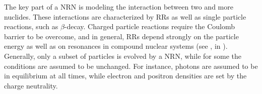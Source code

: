 The key part of a \ac{NRN} is modeling the interaction between two 
and more nuclides. These interactions are characterized by \acp{RR} 
as well as single particle reactions, such as $\beta$-decay. 
Charged particle reactions require the Coulomb barrier to be overcome, 
and in general, \acp{RR} depend strongly on the particle energy as well 
as on resonances in compound nuclear systems (see \eg,  
in \citet{Clayton:1968}). 
%
%
%
%
Generally, only a subset of particles is evolved by a \ac{NRN}, while 
for some the conditions are assumed to be unchanged. For instance, 
photons are assumed to be in equilibrium at all 
times, while electron and positron densities are set by the charge 
neutrality. 

